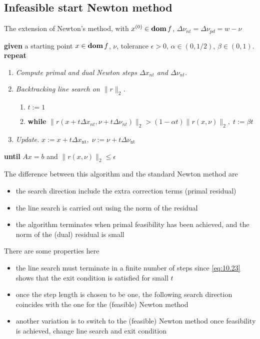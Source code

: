 \subsection{Infeasible start Newton method}
The extension of Newton's method, with $x^{(0)}\in\mathop{\bf dom} f$, $\Delta\nu_{nt}=\Delta\nu_{pd}=w-\nu$
\begin{algorithm}
  $ $\\
  \textbf{given} a starting point $x\in\mathop{\bf dom} f$, $\nu$, tolerance $\epsilon>0$, $\alpha\in(0,1/2)$, $\beta\in(0,1)$.\\
  \textbf{repeat}
  \begin{enumerate}
    \item \textit{Compute primal and dual Newton steps $\Delta x_{nt}$ and $\Delta\nu_{nt}$.}
    \item \textit{Backtracking line search on $\|r\|_2$.}
      \begin{enumerate}
        \item $t:=1$
        \item \textbf{while} $\|r(x+t\Delta x_{nt},\nu+t\Delta\nu_{nt})\|_2>(1-\alpha t)\|r(x,\nu)\|_2,\;t:=\beta t$
      \end{enumerate}
    \item \textit{Update.} $x:=x+t\Delta x_{\text{nt}},\;\nu:=\nu+t\Delta \nu_{\text{nt}}$
  \end{enumerate}
  \textbf{until} $Ax=b$ and $\|r(x,\nu)\|_2\le\epsilon$
\end{algorithm}
The difference between this algorithm and the standard Newton method are
\begin{itemize}
  \item the search direction include the extra correction terms (primal residual)
  \item the line search is carried out using the norm of the residual
  \item the algorithm terminates when primal feasibility has been achieved, and the norm of the (dual) residual is small
\end{itemize}
There are some properties here
\begin{itemize}
  \item the line search must terminate in a finite number of steps since \eqref{eq:10.23} shows that the exit condition is satisfied for small $t$
  \item once the step length is chosen to be one, the following search direction coincides with the one for the (feasible) Newton method
  \item another variation is to switch to the (feasible) Newton method once feasibility is achieved, \ie change line search and exit condition
\end{itemize}

